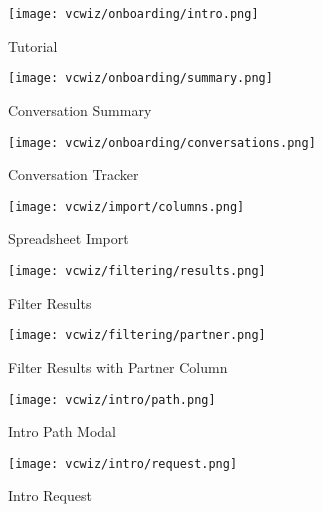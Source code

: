 \begin{figure}[ht]
  \centering
  \texttt{[image: vcwiz/onboarding/intro.png]}
  \caption{Tutorial}
  \label{screenshots:onboarding:intro}
\end{figure}

\begin{figure}[ht]
  \centering
  \texttt{[image: vcwiz/onboarding/summary.png]}
  \caption{Conversation Summary}
  \label{screenshots:onboarding:summary}
\end{figure}

\begin{figure}[ht]
  \centering
  \texttt{[image: vcwiz/onboarding/conversations.png]}
  \caption{Conversation Tracker}
  \label{screenshots:onboarding:conversations}
\end{figure}

\begin{figure}[ht]
  \centering
  \texttt{[image: vcwiz/import/columns.png]}
  \caption{Spreadsheet Import}
  \label{screenshots:import:columns}
\end{figure}

\begin{figure}[ht]
  \centering
  \texttt{[image: vcwiz/filtering/results.png]}
  \caption{Filter Results}
  \label{screenshots:filtering:results}
\end{figure}

\begin{figure}[ht]
  \centering
  \texttt{[image: vcwiz/filtering/partner.png]}
  \caption{Filter Results with Partner Column}
  \label{screenshots:filtering:partner}
\end{figure}

\begin{figure}[ht]
  \centering
  \texttt{[image: vcwiz/intro/path.png]}
  \caption{Intro Path Modal}
  \label{screenshots:intro:path}
\end{figure}

\begin{figure}[ht]
  \centering
  \texttt{[image: vcwiz/intro/request.png]}
  \caption{Intro Request}
  \label{screenshots:intro:request}
\end{figure}

\clearpage
\newpage
